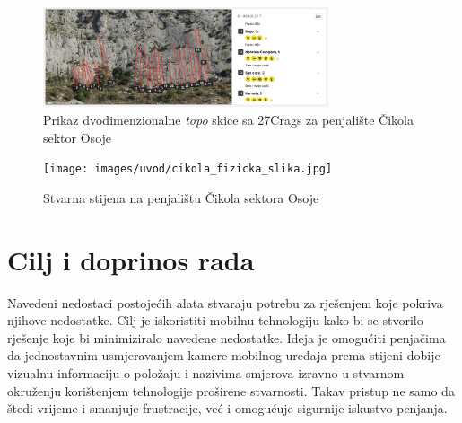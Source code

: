 \begin{figure}[H]
    \centering
    \includegraphics[width=0.75\textwidth]{images/uvod/cikola_27crags_topo.jpeg}
    \caption{Prikaz dvodimenzionalne \textit{topo} skice sa 27Crags za penjalište Čikola sektor Osoje}
\end{figure}

\begin{figure}[H]
    \centering
    \texttt{[image: images/uvod/cikola\_fizicka\_slika.jpg]}
    \caption{Stvarna stijena na penjalištu Čikola sektora Osoje}
\end{figure}

\section{Cilj i doprinos rada}

Navedeni nedostaci postojećih alata stvaraju potrebu za rješenjem koje pokriva njihove nedostatke. Cilj je iskoristiti mobilnu tehnologiju kako bi se stvorilo rješenje koje bi minimiziralo navedene nedostatke. Ideja je omogućiti penjačima da jednostavnim usmjeravanjem kamere mobilnog uređaja prema stijeni dobije vizualnu informaciju o položaju i nazivima smjerova izravno u stvarnom okruženju korištenjem tehnologije proširene stvarnosti. Takav pristup ne samo da štedi vrijeme i smanjuje frustracije, već i omogućuje sigurnije iskustvo penjanja.


